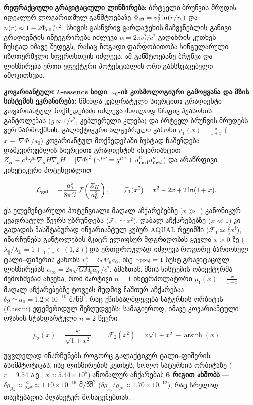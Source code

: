 \documentclass[11pt,a4paper]{article}
\begin{document}
\textbf{რეფრაქციული გრავიტაციული ლინზირება:} ბრტყელი ბრუნვის მრუდის იდეალურ ლოგარითმულ განშტოებაზე $\Phi_{\rm eff}=v_f^2\ln(r/r_0)$ და $n(r)\approx1-2\Phi_{\rm eff}/c^2$. სხივის გასწვრივ გარდატეხის მაჩვენებლის განივი გრადიენტის ინტეგრირება იძლევა $\alpha=2\pi v_f^2/c^2$ გადახრის კუთხეს — ზუსტად იმავე შედეგს, რასაც ზოგადი ფარდობითობა სინგულარული იზოთერმული სფეროსთვის იძლევა. ამ განშტოებაზე ბრუნვა და ლინზირება ერთი ეფექტური პოტენციალის ორი განსხვავებული ამოკითხვაა.

\textbf{კოვარიანტული $k$-essence ხიდი, $a_0$-ის კოსმოლოგიური გამოყვანა და მზის სისტემის ეკრანირება:} წმინდა კვადრატული სივრცითი გრადიენტი კოვარიანტულ მოქმედებაში იძლევა მხოლოდ წრფივ პუასონის განტოლებას ($g \propto 1/r^2$, კეპლერული კლება) და ბრტყელ ბრუნვის მრუდებს ვერ წარმოქმნის. გალაქტიკური ალგებრული კანონი $\mu_1(x) = \frac{x}{1+x}$ ($x \equiv |\nabla\Phi|/a_0$) კოვარიანტულ მოქმედებაში ზუსტად ჩაშენდება დამკვირვებლის სივრცითი გრადიენტის ინვარიანტით $Z_H \equiv c^4\gamma^{\mu\nu}\nabla_\mu H\nabla_\nu H = |\nabla\Phi|^2$ ($\gamma^{\mu\nu} = g^{\mu\nu} + u_{\rm med}^\mu u_{\rm med}^\nu$) და არაწრფივი კინეტიკური პოტენციალით

\[
\mathcal{L}_{\rm gal} = -\frac{a_0^2}{8\pi G}\,\mathcal{F}\!\left(\frac{Z_H}{a_0^2}\right), \qquad \mathcal{F}_1(x^2) = x^2 - 2x + 2\ln(1+x).
\]

ეს ელემენტარული პოტენციალი მაღალ აჩქარებებზე ($x \gg 1$) კანონიკურ კვადრატულ წევრს უბრუნდება ($\mathcal{F}_1 \simeq x^2$), დაბალ აჩქარებებზე ($x \ll 1$) კი გადადის მასშტაბურად ინვარიანტულ კუბურ AQUAL რეჟიმში ($\mathcal{F}_1 \simeq \frac{2}{3}x^3$), ინარჩუნებს განტოლების მკაცრ ელიფსურ მდგრადობას ყველა $x>0$-ზე ($\lambda_\parallel/\lambda_\perp = 1 + \frac{1}{1+x} \in (1,2)$) და ერთდროულად იძლევა როგორც ბარიონულ ტალი–ფიშერის კანონს $v_f^4 = G M_b a_0$, ისე $\gamma_{\rm PPN}=1$ სუსტ გრავიტაციულ ლინზირებას $\alpha_\infty = 2\pi\sqrt{G M_b a_0}/c^2$. ამასთან, მზის სისტემის ობიექტურმა შემოწმებამ აჩვენა, რომ მარტივი $n=1$ ინტერპოლატორი $\mu_1(x)=\frac{x}{1+x}$ მაღალ აჩქარებებზე ტოვებს მუდმივ ნაშთურ აჩქარებას $\delta g \simeq a_0 = 1.2\times 10^{-10}\text{ მ/წმ}^2$, რაც ეწინააღმდეგება სატურნის ორბიტის (Cassini) ეფემერიდულ შეზღუდვებს; სამაგიეროდ, იმავე კოვარიანტული ოჯახის სტანდარტული $n=2$ წევრი

\[
\mu_2(x) = \frac{x}{\sqrt{1+x^2}}, \qquad \mathcal{F}_2(x^2) = x\sqrt{1+x^2} - \operatorname{arsinh}(x)
\]

უცვლელად ინარჩუნებს როგორც გალაქტიკურ ტალი–ფიშერის ასიმპტოტიკას, ისე ლინზირების კუთხეს, ხოლო სატურნის ორბიტაზე ($r = 9.54\text{ ა.ე.}$, $x \approx 5.44\times 10^5$) ანომალურ აჩქარებას \textbf{6 რიგით ახშობს} — $\delta g_{\mu_2} \approx \frac{a_0}{2x^2} \approx 1.10\times 10^{-16}\text{ მ/წმ}^2$ ($\delta g_{\mu_2}/g_N \approx 1.70\times 10^{-12}$), რაც სრულად თავსებადია პლანეტურ მონაცემებთან.
\end{document}
